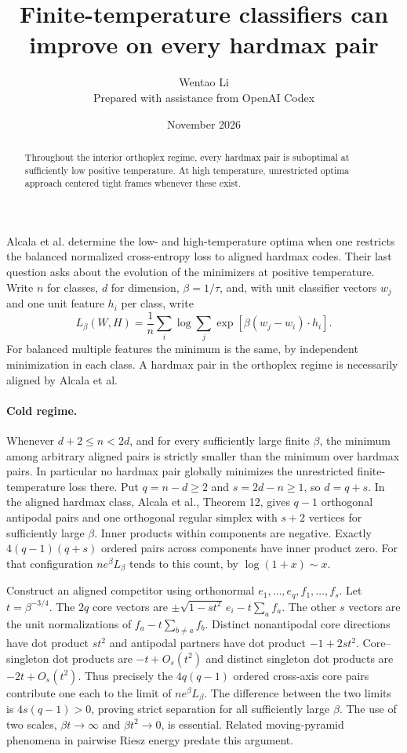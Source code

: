 \documentclass[10pt]{article}
\title{Finite-temperature classifiers can improve on every hardmax pair}
\author{Wentao Li\\{\small Prepared with assistance from OpenAI Codex}}
\date{November 2026}
\begin{document}
\maketitle
\begin{abstract}
Throughout the interior orthoplex regime, every hardmax pair is suboptimal at sufficiently low positive temperature. At high temperature, unrestricted optima approach centered tight frames whenever these exist.
\end{abstract}
Alcala et al. determine the low- and high-temperature optima when one restricts the balanced normalized cross-entropy loss to aligned hardmax codes. Their last question asks about the evolution of the minimizers at positive temperature. Write $n$ for classes, $d$ for dimension, $\beta=1/\tau$, and, with unit classifier vectors $w_j$ and one unit feature $h_i$ per class, write
\[
 L_\beta(W,H)=\frac1n\sum_i\log\sum_j\exp[\beta(w_j-w_i)\cdot h_i].
\]
For balanced multiple features the minimum is the same, by independent minimization in each class. A hardmax pair in the orthoplex regime is necessarily aligned by Alcala et al.

\paragraph{Cold regime.} Whenever $d+2\le n<2d$, and for every sufficiently large finite $\beta$, the minimum among arbitrary aligned pairs is strictly smaller than the minimum over hardmax pairs. In particular no hardmax pair globally minimizes the unrestricted finite-temperature loss there. Put $q=n-d\ge2$ and $s=2d-n\ge1$, so $d=q+s$. In the aligned hardmax class, Alcala et al., Theorem 12, gives $q-1$ orthogonal antipodal pairs and one orthogonal regular simplex with $s+2$ vertices for sufficiently large $\beta$. Inner products within components are negative. Exactly $4(q-1)(q+s)$ ordered pairs across components have inner product zero. For that configuration $ne^\beta L_\beta$ tends to this count, by $\log(1+x)\sim x$.

Construct an aligned competitor using orthonormal $e_1,\ldots,e_q,f_1,\ldots,f_s$. Let $t=\beta^{-3/4}$. The $2q$ core vectors are
$\pm\sqrt{1-st^2}\,e_i-t\sum_a f_a$.
The other $s$ vectors are the unit normalizations of $f_a-t\sum_{b\ne a} f_b$. Distinct nonantipodal core directions have dot product $st^2$ and antipodal partners have dot product $-1+2st^2$. Core--singleton dot products are $-t+O_s(t^2)$ and distinct singleton dot products are $-2t+O_s(t^2)$. Thus precisely the $4q(q-1)$ ordered cross-axis core pairs contribute one each to the limit of $ne^\beta L_\beta$. The difference between the two limits is $4s(q-1)>0$, proving strict separation for all sufficiently large $\beta$. The use of two scales, $\beta t\to\infty$ and $\beta t^2\to0$, is essential. Related moving-pyramid phenomena in pairwise Riesz energy predate this argument.
\end{document}
